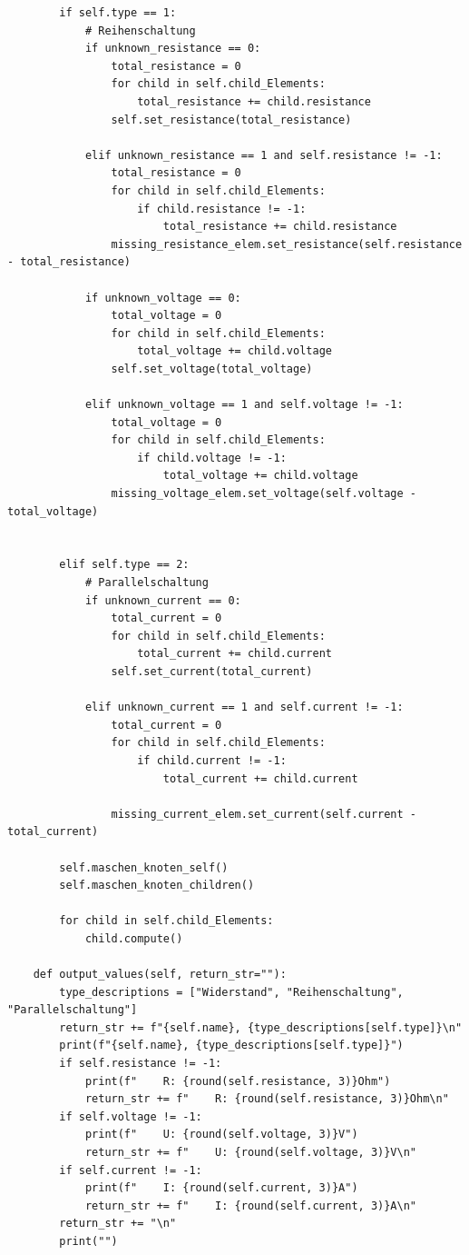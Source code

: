 \documentclass[a4paper,10pt,ngerman]{scrartcl}
\begin{document}
\begin{lstlisting}
        if self.type == 1:
            # Reihenschaltung
            if unknown_resistance == 0:
                total_resistance = 0
                for child in self.child_Elements:
                    total_resistance += child.resistance
                self.set_resistance(total_resistance)

            elif unknown_resistance == 1 and self.resistance != -1:
                total_resistance = 0
                for child in self.child_Elements:
                    if child.resistance != -1:
                        total_resistance += child.resistance
                missing_resistance_elem.set_resistance(self.resistance - total_resistance)

            if unknown_voltage == 0:
                total_voltage = 0
                for child in self.child_Elements:
                    total_voltage += child.voltage
                self.set_voltage(total_voltage)

            elif unknown_voltage == 1 and self.voltage != -1:
                total_voltage = 0
                for child in self.child_Elements:
                    if child.voltage != -1:
                        total_voltage += child.voltage
                missing_voltage_elem.set_voltage(self.voltage - total_voltage)


        elif self.type == 2:
            # Parallelschaltung
            if unknown_current == 0:
                total_current = 0
                for child in self.child_Elements:
                    total_current += child.current
                self.set_current(total_current)

            elif unknown_current == 1 and self.current != -1:
                total_current = 0
                for child in self.child_Elements:
                    if child.current != -1:
                        total_current += child.current

                missing_current_elem.set_current(self.current - total_current)

        self.maschen_knoten_self()
        self.maschen_knoten_children()

        for child in self.child_Elements:
            child.compute()

    def output_values(self, return_str=""):
        type_descriptions = ["Widerstand", "Reihenschaltung", "Parallelschaltung"]
        return_str += f"{self.name}, {type_descriptions[self.type]}\n"
        print(f"{self.name}, {type_descriptions[self.type]}")
        if self.resistance != -1:
            print(f"    R: {round(self.resistance, 3)}Ohm")
            return_str += f"    R: {round(self.resistance, 3)}Ohm\n"
        if self.voltage != -1:
            print(f"    U: {round(self.voltage, 3)}V")
            return_str += f"    U: {round(self.voltage, 3)}V\n"
        if self.current != -1:
            print(f"    I: {round(self.current, 3)}A")
            return_str += f"    I: {round(self.current, 3)}A\n"
        return_str += "\n"
        print("")


\end{lstlisting}
\end{document}

